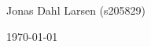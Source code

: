 \begin{titlepage}
\begin{minipage}{\textwidth}
\begin{flushleft}
            Jonas Dahl Larsen (s205829)
            

		\end{flushleft}
	 \end{minipage} 
    \vspace*{1\baselineskip}


    


	
	
	{\large \today} %
	
	\vfill %
	
\end{titlepage}
